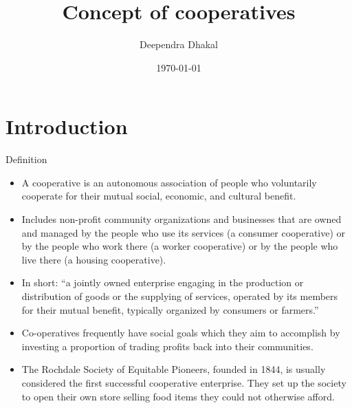 \documentclass[12pt,ignorenonframetext,aspectratio=169]{beamer}
\title{\insertsectionhead}
  {
    \definecolor{white}{rgb}{0.776,0.357,0.157}
    \definecolor{iqss@orange}{rgb}{1,1,1}
    \ifnum \insertmainframenumber > \insertframenumber
    \frame{
      \frametitle{\iqsssectiontitleheader}
      \tableofcontents[currentsection]
    }
    \else
    \frame{
      \frametitle{Backup Slides}
      \tableofcontents[sectionstyle=shaded/shaded,subsectionstyle=shaded/shaded/shaded]
    }
    \fi
  }
\title[]{Concept of cooperatives}
\author[
        Deependra Dhakal
    ]{Deependra Dhakal}
\institute[
    ]{
    GAASC, Baitadi \and Tribhuwan University
    }
\date[
      \today
  ]{
      \today
        }
\providecommand{\tightlist}{%
  \setlength{\itemsep}{0pt}\setlength{\parskip}{0pt}}
\begin{document}
  \begin{frame}[plain]
  \titlepage
  \end{frame}



\hypertarget{introduction}{%
\section{Introduction}\label{introduction}}

\begin{frame}{Definition}
\protect\hypertarget{definition}{}
\begin{itemize}
\tightlist
\item
  A cooperative is an autonomous association of people who voluntarily
  cooperate for their mutual social, economic, and cultural benefit.
\item
  Includes non-profit community organizations and businesses that are
  owned and managed by the people who use its services (a consumer
  cooperative) or by the people who work there (a worker cooperative) or
  by the people who live there (a housing cooperative).
\item
  In short: ``a jointly owned enterprise engaging in the production or
  distribution of goods or the supplying of services, operated by its
  members for their mutual benefit, typically organized by consumers or
  farmers.''
\item
  Co-operatives frequently have social goals which they aim to
  accomplish by investing a proportion of trading profits back into
  their communities.
\item
  The Rochdale Society of Equitable Pioneers, founded in 1844, is
  usually considered the first successful cooperative enterprise. They
  set up the society to open their own store selling food items they
  could not otherwise afford.
\end{itemize}
\end{frame}
\end{document}
